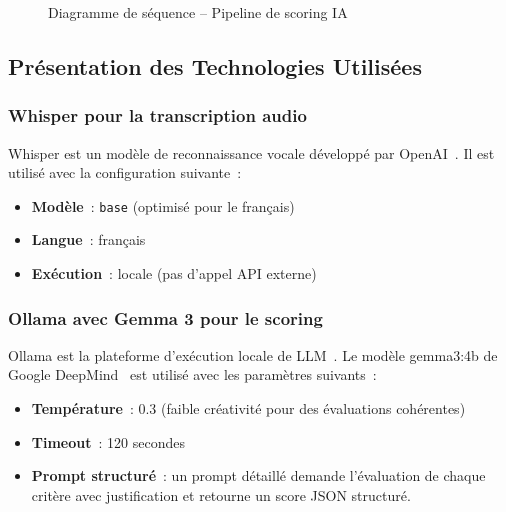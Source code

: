 \begin{figure}[H]
    \centering
    \caption{Diagramme de séquence -- Pipeline de scoring IA}
    \label{fig:sprint3_ia_pipeline}
\end{figure}

\subsection{Présentation des Technologies Utilisées}
\label{subsec:sprint3_tech}

\subsubsection{Whisper pour la transcription audio}

Whisper est un modèle de reconnaissance vocale développé par OpenAI~\cite{Whisper}. Il est
utilisé avec la configuration suivante~:

\begin{itemize}
    \item \textbf{Modèle}~: \texttt{base} (optimisé pour le français)
    \item \textbf{Langue}~: français
    \item \textbf{Exécution}~: locale (pas d'appel API externe)
\end{itemize}

\subsubsection{Ollama avec Gemma 3 pour le scoring}

Ollama est la plateforme d'exécution locale de LLM~\cite{Ollama}. Le modèle gemma3:4b de
Google DeepMind~\cite{Gemma3} est utilisé avec les paramètres suivants~:

\begin{itemize}
    \item \textbf{Température}~: 0.3 (faible créativité pour des évaluations cohérentes)
    \item \textbf{Timeout}~: 120 secondes
    \item \textbf{Prompt structuré}~: un prompt détaillé demande l'évaluation de chaque
    critère avec justification et retourne un score JSON structuré.
\end{itemize}

